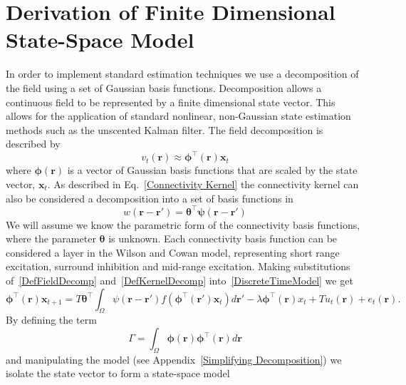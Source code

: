 \documentclass[onecolumn,draftcls]{IEEEtran}
\begin{document}
\section{Derivation of Finite Dimensional State-Space Model}
In order to implement standard estimation techniques we use a decomposition of the field using a set of Gaussian basis functions. Decomposition allows a continuous field to be represented by a finite dimensional state vector. This allows for the application of standard nonlinear, non-Gaussian state estimation methods such as the unscented Kalman filter. The field decomposition is described by
\begin{equation}\label{DefFieldDecomp}
	v_t\left(\mathbf{r}\right) \approx \boldsymbol{\phi}^{\top}\left(\mathbf{r}\right) \mathbf{x}_t
\end{equation}
where $\mathbf{\boldsymbol{\phi}}(\mathbf{r})$ is a vector of Gaussian basis functions that are scaled by the state vector, $\mathbf{x}_t$. As described in Eq.~\ref{Connectivity Kernel} the connectivity kernel can also be considered a decomposition into a set of basis functions in 
\begin{equation}\label{DefKernelDecomp}
	w\left(\mathbf{r}-\mathbf{r}'\right) = \mathbf{\theta}^{\top} \mathbf{\psi}\left(\mathbf{r}-\mathbf{r}'\right)
\end{equation}
We will assume we know the parametric form of the connectivity basis functions, where the parameter $\mathbf{\theta}$ is unknown. Each connectivity basis function can be considered a layer in the Wilson and Cowan model, representing short range excitation, surround inhibition and mid-range excitation. Making substitutions of~\ref{DefFieldDecomp} and~\ref{DefKernelDecomp} into~\ref{DiscreteTimeModel} we get
\begin{equation}\label{reduced continuous model}
	\boldsymbol{\phi}^{\top}\left( \mathbf{r} \right) \mathbf{x}_{t+1} = T\mathbf{\theta}^{\top}\int_\Omega  {\psi \left(\mathbf{r}-\mathbf{r}'\right) f\left( \boldsymbol{\phi} ^{\top}\left(\mathbf{r}'\right)\mathbf{x}_t \right)d\mathbf{r}'}  - \lambda\boldsymbol{\phi}^{\top}\left(\mathbf{r}\right)x_t + T u_t\left(\mathbf{r}\right) + e_t\left(\mathbf{r}\right).
\end{equation}
By defining the term
\begin{equation}\label{DefGamma}
	\Gamma  = \int_\Omega  {\boldsymbol{\phi} \left(\mathbf{r}\right)\boldsymbol{\phi} ^{\top}\left(\mathbf{r}\right)d\mathbf{r}}
\end{equation}
and manipulating the model (see Appendix~\ref{Simplifying Decomposition}) we isolate the state vector to form a state-space model
\end{document}

